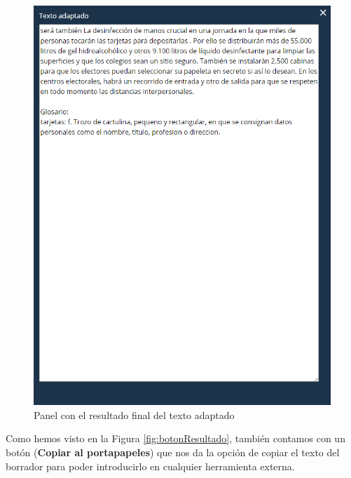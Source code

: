 \begin{figure}[h!]
	\centering
	
	
	\includegraphics[scale=0.8]{Imagenes/Figuras/PanelDerecho}
	
	
	\caption{Panel con el resultado final del texto adaptado}
	\label{fig:panelFinal}
\end{figure}

Como hemos visto en la Figura \ref{fig:botonResultado}, también contamos con un botón (\textbf{Copiar al portapapeles}) que nos da la opción de copiar el texto del borrador para poder introducirlo en cualquier herramienta externa.


